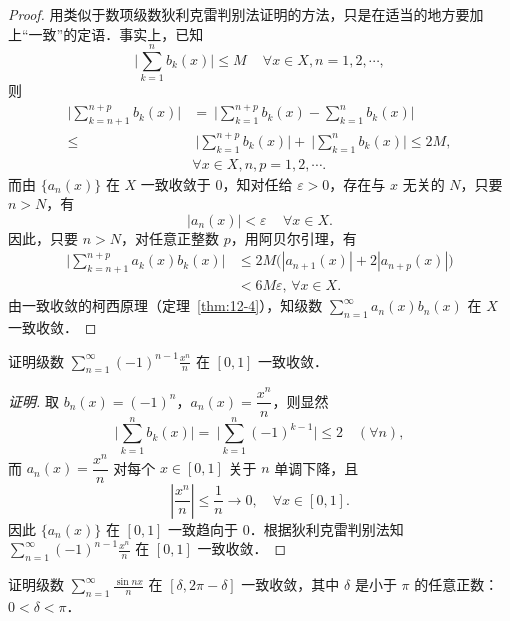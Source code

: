 \begin{proof}
用类似于数项级数狄利克雷判别法证明的方法，只是在适当的地方要加上``一致''的定语．事实上，已知
\[
\Big|\sum_{k=1}^{n}b_{k}(x)\Big|\leqslant M\quad\,\forall x\in X,n=1,2,\cdots,
\]
则
\[
\begin{aligned}
\Big|\sum_{k=n+1}^{n+p}b_{k}(x)\Big|&=\ \Big|\sum_{k=1}^{n+p}b_{k}(x)-\sum_{k=1}^{n}b_{k}(x)\Big|\\
\leqslant&\ \Big|\sum_{k=1}^{n+p}b_{k}(x)\Big|+\ \Big|\sum_{k=1}^{n}b_{k}(x)\Big|\leqslant 2M,\\
&\forall x\in X,n,p=1,2,\cdots.
\end{aligned}
\]
而由 $\{a_{n}(x)\}$ 在 $X$ 一致收敛于 $0$，知对任给 $\varepsilon>0$，存在与 $x$ 无关的 $N$，只要 $n>N$，有
\[
\left|a_{n}(x)\right|<\varepsilon\quad\,\forall x\in X.
\]
因此，只要 $n>N$，对任意正整数 $p$，用阿贝尔引理，有
\[
\begin{aligned}
\Big|\sum_{k=n+1}^{n+p}a_{k}(x)b_{k}(x)\Big|&\leqslant 2M\big(\left|a_{n+1}(x)\right|+2\left|a_{n+p}(x)\right|\big)\\
&<6M\varepsilon,\,\forall x\in X.
\end{aligned}
\]
由一致收敛的柯西原理（定理~\ref{thm:12-4}），知级数 $\displaystyle\sum_{n=1}^{\infty}a_{n}(x)b_{n}(x)$ 在 $X$ 一致收敛．
\end{proof}

\begin{example}\label{ex:12-2-9}
证明级数 $\displaystyle\sum_{n=1}^{\infty}(-1)^{n-1}\frac{x^{n}}{n}$ 在 $[0,1]$ 一致收敛．
\end{example}

\begin{proof}[证明]
取 $b_{n}(x)=(-1)^{n}$，$a_{n}(x)=\dfrac{x^{n}}{n}$，则显然
\[
\Big|\sum_{k=1}^{n}b_{k}(x)\Big|=\ \Big|\sum_{k=1}^{n}(-1)^{k-1}\Big|\leqslant 2\quad(\forall n),
\]
而 $a_{n}(x)=\dfrac{x^{n}}{n}$ 对每个 $x\in[0,1]$ 关于 $n$ 单调下降，且
\[
\left|\frac{x^{n}}{n}\right|\leqslant\frac{1}{n}\to 0,\quad\forall x\in[0,1].
\]
因此 $\{a_{n}(x)\}$ 在 $[0,1]$ 一致趋向于 $0$．根据狄利克雷判别法知 $\displaystyle\sum_{n=1}^{\infty}(-1)^{n-1}\frac{x^{n}}{n}$ 在 $[0,1]$ 一致收敛．
\end{proof}

\begin{example}\label{ex:12-2-10}
证明级数 $\displaystyle\sum_{n=1}^{\infty}\frac{\sin nx}{n}$ 在 $[\delta,2\pi-\delta]$ 一致收敛，其中 $\delta$ 是小于 $\pi$ 的任意正数：$0<\delta<\pi$．
\end{example}

